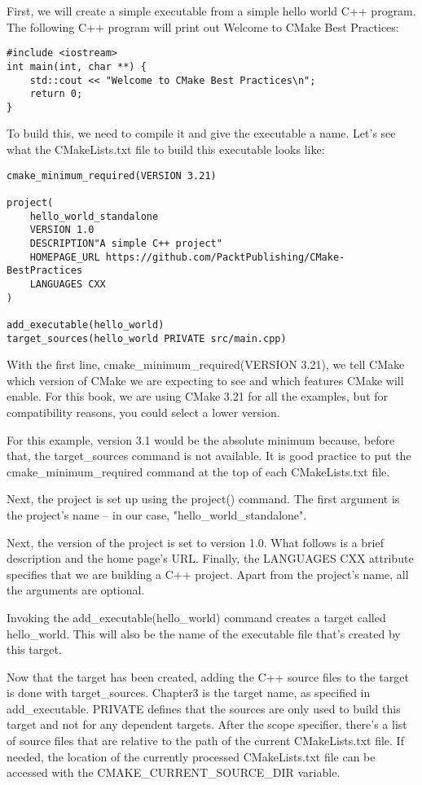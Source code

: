 First, we will create a simple executable from a simple hello world C++ program. The following C++ program will print out Welcome to CMake Best Practices:

\begin{lstlisting}[style=styleCXX]
#include <iostream>
int main(int, char **) {
	std::cout << "Welcome to CMake Best Practices\n";
	return 0;
}
\end{lstlisting}

To build this, we need to compile it and give the executable a name. Let's see what the CMakeLists.txt file to build this executable looks like:

\begin{lstlisting}[style=styleCMake]
cmake_minimum_required(VERSION 3.21)

project(
	hello_world_standalone
	VERSION 1.0
	DESCRIPTION"A simple C++ project"
	HOMEPAGE_URL https://github.com/PacktPublishing/CMake-BestPractices
	LANGUAGES CXX
)

add_executable(hello_world)
target_sources(hello_world PRIVATE src/main.cpp)
\end{lstlisting}

With the first line, cmake\_minimum\_required(VERSION 3.21), we tell CMake which version of CMake we are expecting to see and which features CMake will enable. For this book, we are using CMake 3.21 for all the examples, but for compatibility reasons, you could select a lower version.

For this example, version 3.1 would be the absolute minimum because, before that, the target\_sources command is not available. It is good practice to put the cmake\_minimum\_required command at the top of each CMakeLists.txt file. 

Next, the project is set up using the project() command. The first argument is the project's name – in our case, "hello\_world\_standalone".

Next, the version of the project is set to version 1.0. What follows is a brief description and the home page's URL. Finally, the LANGUAGES CXX attribute specifies that we are building a C++ project. Apart from the project's name, all the arguments are optional.

Invoking the add\_executable(hello\_world) command creates a target called hello\_world. This will also be the name of the executable file that's created by this target.

Now that the target has been created, adding the C++ source files to the target is done with target\_sources. Chapter3 is the target name, as specified in add\_executable. PRIVATE defines that the sources are only used to build this target and not for any dependent targets. After the scope specifier, there's a list of source files that are relative to the path of the current CMakeLists.txt file. If needed, the location of the currently processed CMakeLists.txt file can be accessed with the CMAKE\_CURRENT\_SOURCE\_DIR variable.

